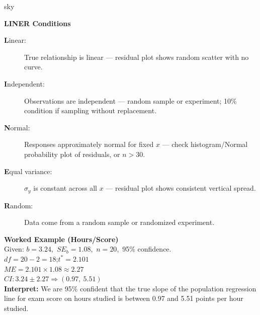 \documentclass[10pt]{article}
\begin{document}
\begin{skillbox}{sky}
\begin{minipage}[t]{0.48\linewidth}
    \textbf{LINER Conditions}
    \begin{description}
        \item[\textbf{L}inear:] True relationship is linear --- residual plot shows
              random scatter with no curve.
        \item[\textbf{I}ndependent:] Observations are independent --- random sample or
              experiment; 10\% condition if sampling without replacement.
        \item[\textbf{N}ormal:] Responses approximately normal for fixed $x$ --- check
              histogram/Normal probability plot of residuals, or $n > 30$.
        \item[\textbf{E}qual variance:] $\sigma_y$ is constant across all $x$ --- residual
              plot shows consistent vertical spread.
        \item[\textbf{R}andom:] Data come from a random sample or randomized experiment.
    \end{description}
\end{minipage}
\hfill
\begin{minipage}[t]{0.48\linewidth}
    \textbf{Worked Example (Hours/Score)}\\[4pt]
    Given: $b = 3.24$,\ $SE_b = 1.08$,\ $n = 20$,\ 95\% confidence.\\[4pt]
    $df = 20 - 2 = 18$;\quad $t^* = 2.101$\\[4pt]
    $ME = 2.101 \times 1.08 \approx 2.27$\\[4pt]
    $CI: 3.24 \pm 2.27 \Rightarrow (0.97,\ 5.51)$\\[6pt]
    \textbf{Interpret:} We are 95\% confident that the true slope of the
    population regression line for exam score on hours studied is between 0.97
    and 5.51 points per hour studied.
\end{minipage}
\end{skillbox}
\end{document}
